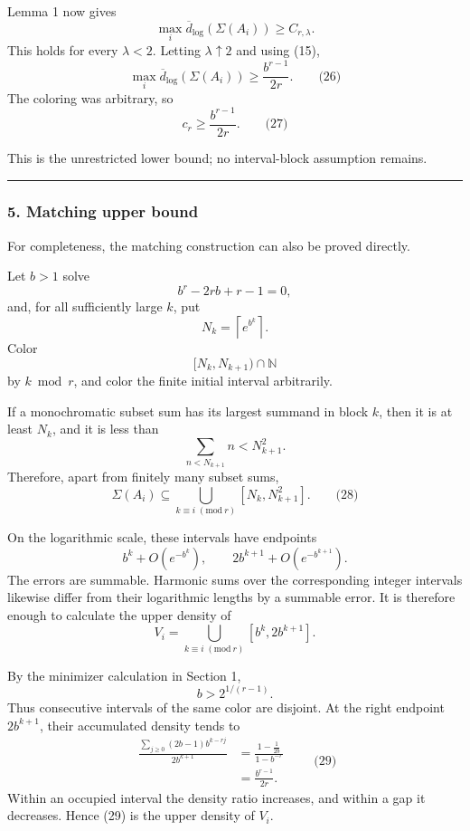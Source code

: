 \documentclass[
  11pt,
  a4paper,
]{article}
\begin{document}
Lemma 1 now gives \[
\max_i\overline d_{\log}(\Sigma(A_i))
\ge C_{r,\lambda}.
\] This holds for every \(\lambda<2\). Letting \(\lambda\uparrow2\) and
using (15), \[
\max_i\overline d_{\log}(\Sigma(A_i))
\ge\frac{b^{r-1}}{2r}.
\qquad\text{(26)}
\] The coloring was arbitrary, so \[
c_r\ge\frac{b^{r-1}}{2r}.
\qquad\text{(27)}
\]

This is the unrestricted lower bound; no interval-block assumption
remains.

\begin{center}\rule{0.5\linewidth}{0.5pt}\end{center}

\subsubsection{5. Matching upper bound}\label{matching-upper-bound}

For completeness, the matching construction can also be proved directly.

Let \(b>1\) solve \[
b^r-2rb+r-1=0,
\] and, for all sufficiently large \(k\), put \[
N_k=\left\lceil e^{b^k}\right\rceil.
\] Color \[
[N_k,N_{k+1})\cap\mathbb N
\] by \(k\bmod r\), and color the finite initial interval arbitrarily.

If a monochromatic subset sum has its largest summand in block \(k\),
then it is at least \(N_k\), and it is less than \[
\sum_{n<N_{k+1}}n<N_{k+1}^2.
\] Therefore, apart from finitely many subset sums, \[
\Sigma(A_i)
\subseteq
\bigcup_{k\equiv i\;(\mathrm{mod}\ r)}
[N_k,N_{k+1}^2].
\qquad\text{(28)}
\]

On the logarithmic scale, these intervals have endpoints \[
b^k+O(e^{-b^k}),
\qquad
2b^{k+1}+O(e^{-b^{k+1}}).
\] The errors are summable. Harmonic sums over the corresponding integer
intervals likewise differ from their logarithmic lengths by a summable
error. It is therefore enough to calculate the upper density of \[
V_i=\bigcup_{k\equiv i\;(\mathrm{mod}\ r)}
[b^k,2b^{k+1}].
\]

By the minimizer calculation in Section 1, \[
b>2^{1/(r-1)}.
\] Thus consecutive intervals of the same color are disjoint. At the
right endpoint \(2b^{k+1}\), their accumulated density tends to
\begin{equation*}
\begin{aligned}
\frac{\sum_{j\ge0}(2b-1)b^{k-rj}}{2b^{k+1}}
&=\frac{1-\frac1{2b}}{1-b^{-r}}\\
&=\frac{b^{r-1}}{2r}.
\end{aligned}
\qquad\text{(29)}
\end{equation*} Within an occupied interval the density ratio increases,
and within a gap it decreases. Hence (29) is the upper density of
\(V_i\).
\end{document}
